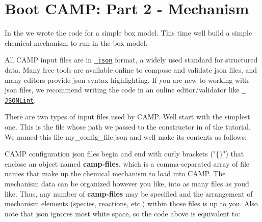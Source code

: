 \chapter{Boot CAMP\+: Part 2 -\/ Mechanism}
\hypertarget{camp_tutorial_part_2}{}\label{camp_tutorial_part_2}
In the  we wrote the code for a simple box model. This time we\textquotesingle{}ll build a simple chemical mechanism to run in the box model.

All CAMP input files are in \href{http://json.org}{\texttt{ json}} format, a widely used standard for structured data. Many free tools are available online to compose and validate {\ttfamily json} files, and many editors provide {\ttfamily json} syntax highlighting. If you are new to working with {\ttfamily json} files, we recommend writing the code in an online editor/validator like \href{https://jsonlint.com}{\texttt{ JSONLint}}.

There are two types of input files used by CAMP. We\textquotesingle{}ll start with the simplest one. This is the file whose path we passed to the  constructor in  of the tutorial. We named this file {\ttfamily my\+\_\+config\+\_\+file.\+json} and we\textquotesingle{}ll make its contents as follows\+: 
\begin{DoxyCode}{0}
\DoxyCodeLine{\{}
\DoxyCodeLine{\ \ "{}camp-\/files"{}\ :\ [}
\DoxyCodeLine{\ \ ]}
\DoxyCodeLine{\}}

\end{DoxyCode}
 CAMP configuration {\ttfamily json} files begin and end with curly brackets ("{}\{\}"{}) that enclose an object named {\bfseries{camp-\/files}}, which is a comma-\/separated array of file names that make up the chemical mechanism to load into CAMP. The mechanism data can be organized however you like, into as many files as you\textquotesingle{}d like. Thus, any number of {\bfseries{camp-\/files}} may be specified and the arrangement of mechanism elements (species, reactions, etc.) within those files is up to you. Also note that {\ttfamily json} ignores most white space, so the code above is equivalent to\+: 
\begin{DoxyCode}{0}

\end{DoxyCode}


